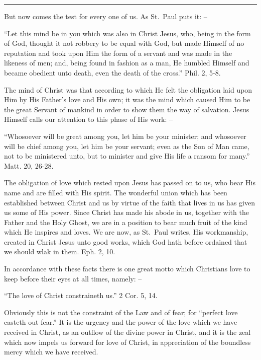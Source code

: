 \documentclass[
]{book}
\begin{document}
\begin{center}\rule{0.5\linewidth}{0.5pt}\end{center}

But now comes the test for every one of us. As St.~Paul puts it: --

``Let this mind be in you which was also in Christ Jesus, who, being in the form of God, thought it not robbery to be equal with God, but made Himself of no reputation and took upon Him the form of a servant and was made in the likeness of men; and, being found in fashion as a man, He humbled Himself and became obedient unto death, even the death of the cross.'' Phil. 2, 5-8.

The mind of Christ was that according to which He felt the obligation laid upon Him by His Father's love and His own; it was the mind which caused Him to be the great Servant of mankind in order to show them the way of salvation. Jesus Himself calls our attention to this phase of His work: --

``Whosoever will be great among you, let him be your minister; and whosoever will be chief among you, let him be your servant; even as the Son of Man came, not to be ministered unto, but to minister and give His life a ransom for many.'' Matt. 20, 26-28.

The obligation of love which rested upon Jesus has passed on to us, who bear His name and are filled with His spirit. The wonderful union which has been established between Christ and us by virtue of the faith that lives in us has given us some of His power. Since Christ has made his abode in us, together with the Father and the Holy Ghost, we are in a position to bear much fruit of the kind which He inspires and loves. We are now, as St.~Paul writes, His workmanship, created in Christ Jesus unto good works, which God hath before ordained that we should wlak in them. Eph. 2, 10.

In accordance with these facts there is one great motto which Christians love to keep before their eyes at all times, namely: --

``The love of Christ constraineth us.'' 2 Cor. 5, 14.

Obviously this is not the constraint of the Law and of fear; for ``perfect love casteth out fear.'' It is the urgency and the power of the love which we have received in Christ, as an outflow of the divine power in Christ, and it is the zeal which now impels us forward for love of Christ, in appreciation of the boundless mercy which we have received.
\end{document}
